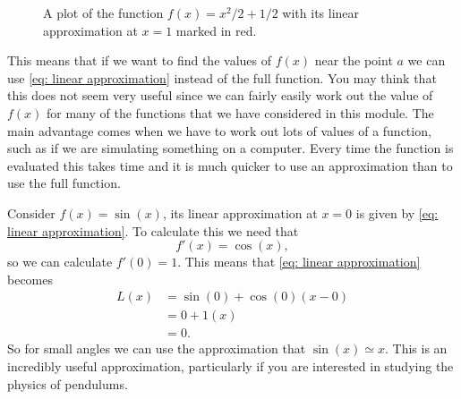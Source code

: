 \begin{figure}[ht]
    \centering
{}
    \caption{A plot of the function $f(x)=x^{2}/2+1/2$ with its linear approximation at $x=1$ marked in red. }
        \label{fig: linear approximation}
\end{figure}


This means that if we want to find the values of $f(x)$ near the point $a$ we can use \cref{eq: linear approximation} instead of the full function.  You may think that this does not seem very useful since we can fairly easily work out the value of $f(x)$ for many of the functions that we have considered in this module. The main advantage comes when we have to work out lots of values of a function, such as if we are simulating something on a computer. Every time the function is evaluated this takes time and it is much quicker to use an approximation than to use the full function. \\

\begin{ex}
Consider $f(x)=\sin(x)$, its linear approximation at $x=0$ is given by \cref{eq: linear approximation}. To calculate this we need that
\begin{equation*}
f'(x)=\cos(x),
\end{equation*}
so we can calculate $f'(0)=1$. This means that \cref{eq: linear approximation} becomes
\begin{align*}
L(x)	&=\sin(0)+\cos(0)\left(x-0\right)\\
	&=0+1\left(x\right)\\
	&=0.
\end{align*}
So for small angles we can use the approximation that $\sin(x)\simeq x$. This is an incredibly useful approximation, particularly if you are interested in studying the physics of pendulums. 
\end{ex}

